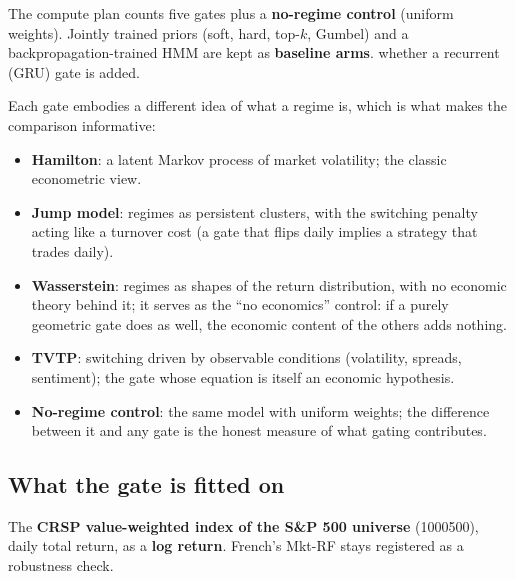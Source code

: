 The compute plan counts five gates plus a \textbf{no-regime control} (uniform weights). Jointly trained priors
(soft, hard, top-$k$, Gumbel) and a backpropagation-trained HMM are kept as \textbf{baseline arms}. 
whether a recurrent (GRU) gate is added.

\begin{whybox}
Each gate embodies a different idea of what a regime is, which is what makes the comparison informative:
\begin{itemize}
\item \textbf{Hamilton}: a latent Markov process of market volatility; the classic econometric view.
\item \textbf{Jump model}: regimes as persistent clusters, with the switching penalty acting like a turnover
  cost (a gate that flips daily implies a strategy that trades daily).
\item \textbf{Wasserstein}: regimes as shapes of the return distribution, with no economic theory behind it;
  it serves as the ``no economics'' control: if a purely geometric gate does as well, the economic content
  of the others adds nothing.
\item \textbf{TVTP}: switching driven by observable conditions (volatility, spreads, sentiment); the gate
  whose equation is itself an economic hypothesis.
\item \textbf{No-regime control}: the same model with uniform weights; the difference between it and any gate is
  the honest measure of what gating contributes.
\end{itemize}
\end{whybox}

\subsection{What the gate is fitted on}
\label{sec:gateinput}

 The \textbf{CRSP value-weighted index of the S\&P 500 universe} (1000500), daily total
return, as a \textbf{log return}. French's Mkt-RF stays registered as a robustness check.

